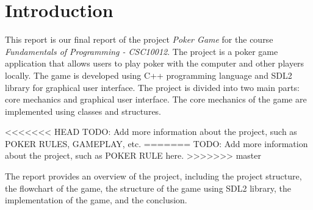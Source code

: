\section{Introduction}
\label{sec:introduction}

\hspace{1cm} This report is our final report of the project \textit{Poker Game} for the course \textit{Fundamentals of Programming - CSC10012}. The project is a poker game application that allows users to play poker with the computer and other players locally. The game is developed using C++ programming language and SDL2 library for graphical user interface. The project is divided into two main parts: core mechanics and graphical user interface. The core mechanics of the game are implemented using classes and structures.

\vspace{0.5cm}

<<<<<<< HEAD
\hspace{1cm} TODO: Add more information about the project, such as POKER RULES, GAMEPLAY, etc.
=======
\hspace{1cm} TODO: Add more information about the project, such as POKER RULE here.
>>>>>>> master

\vspace{0.5cm}

\hspace{1cm} The report provides an overview of the project, including the project structure, the flowchart of the game, the structure of the game using SDL2 library, the implementation of the game, and the conclusion.

